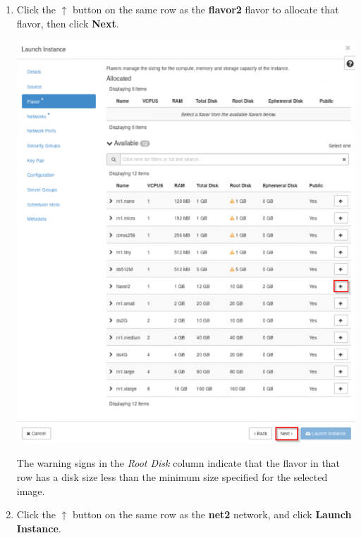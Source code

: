 \documentclass[letterpaper, 12pt]{article}
\begin{document}
\begin{enumerate}
    \item Click the $\uparrow$ button on the same row as the \textbf{flavor2} flavor to allocate that flavor, then
    click \textbf{Next}.
    \begin{center}
        \includegraphics[width=\linewidth]{images/part4/step5.png}
    \end{center}

    \begin{notebox}
        The warning signs in the \textit{Root Disk} column indicate that the flavor in that row has a disk size less
        than the minimum size specified for the selected image.
    \end{notebox}

    \item Click the $\uparrow$ button on the same row as the \textbf{net2} network, and click \textbf{Launch Instance}.


\end{enumerate}
\end{document}
